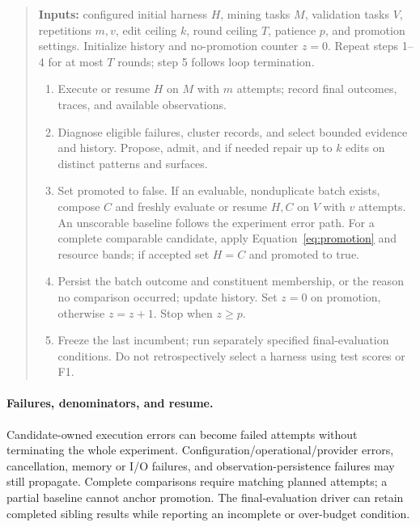 \begin{quote}\small
\textbf{Inputs:} configured initial harness $H$, mining tasks $M$, validation
tasks $V$, repetitions $m,v$, edit ceiling $k$, round ceiling $T$, patience $p$,
and promotion settings. Initialize history and no-promotion counter $z=0$.
Repeat steps 1--4 for at most $T$ rounds; step 5 follows loop termination.
\begin{enumerate}
\item Execute or resume $H$ on $M$ with $m$ attempts;
record final outcomes, traces, and available observations.
\item Diagnose eligible failures, cluster records, and select bounded evidence
and history. Propose, admit, and if needed repair up to $k$ edits on distinct
patterns and surfaces.
\item Set promoted to false. If an evaluable, nonduplicate batch exists, compose
$C$ and freshly evaluate or resume $H,C$ on $V$ with $v$ attempts. An unscorable
baseline follows the experiment error path. For a complete comparable candidate,
apply Equation~\ref{eq:promotion} and resource bands; if accepted set $H=C$ and
promoted to true.
\item Persist the batch outcome and constituent membership, or the reason no
comparison occurred; update history. Set $z=0$ on promotion, otherwise $z=z+1$.
Stop when $z\geq p$.
\item Freeze the last incumbent; run separately specified final-evaluation
conditions. Do not retrospectively select a harness using test scores or F1.
\end{enumerate}
\end{quote}

\paragraph{Failures, denominators, and resume.}
Candidate-owned execution errors can become failed attempts without terminating
the whole experiment. Configuration/operational/provider errors, cancellation,
memory or I/O failures, and observation-persistence failures may still propagate.
Complete comparisons require matching planned attempts; a partial baseline cannot
anchor promotion. The final-evaluation driver can retain completed sibling
results while reporting an incomplete or over-budget condition.

